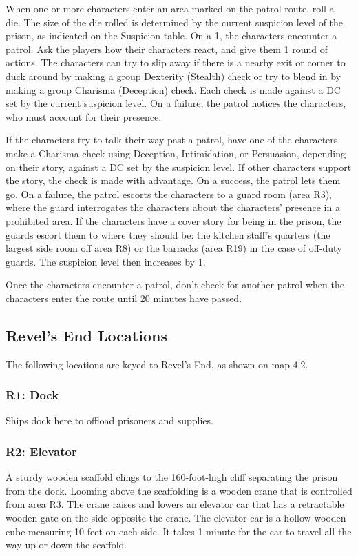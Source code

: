 \documentclass[10pt,a4paper,twoside,bg=print,twocolumn,openany,nodeprecatedcode]{dndbook}
\begin{document}
When one or more characters enter an area marked on the patrol route, roll a die. The size of the die rolled is determined by the current suspicion level of the prison, as indicated on the Suspicion table. On a 1, the characters encounter a patrol. Ask the players how their characters react, and give them 1 round of actions. The characters can try to slip away if there is a nearby exit or corner to duck around by making a group Dexterity (Stealth) check or try to blend in by making a group Charisma (Deception) check. Each check is made against a DC set by the current suspicion level. On a failure, the patrol notices the characters, who must account for their presence.

If the characters try to talk their way past a patrol, have one of the characters make a Charisma check using Deception, Intimidation, or Persuasion, depending on their story, against a DC set by the suspicion level. If other characters support the story, the check is made with advantage. On a success, the patrol lets them go. On a failure, the patrol escorts the characters to a guard room (area R3), where the guard interrogates the characters about the characters' presence in a prohibited area. If the characters have a cover story for being in the prison, the guards escort them to where they should be: the kitchen staff's quarters (the largest side room off area R8) or the barracks (area R19) in the case of off-duty guards. The suspicion level then increases by 1.

Once the characters encounter a patrol, don't check for another patrol when the characters enter the route until 20 minutes have passed.

\subsection{Revel's End Locations}
The following locations are keyed to Revel's End, as shown on map 4.2.

\subsubsection{R1: Dock}
Ships dock here to offload prisoners and supplies.

\subsubsection{R2: Elevator}
A sturdy wooden scaffold clings to the 160-foot-high cliff separating the prison from the dock. Looming above the scaffolding is a wooden crane that is controlled from area R3. The crane raises and lowers an elevator car that has a retractable wooden gate on the side opposite the crane. The elevator car is a hollow wooden cube measuring 10 feet on each side. It takes 1 minute for the car to travel all the way up or down the scaffold.
\end{document}
